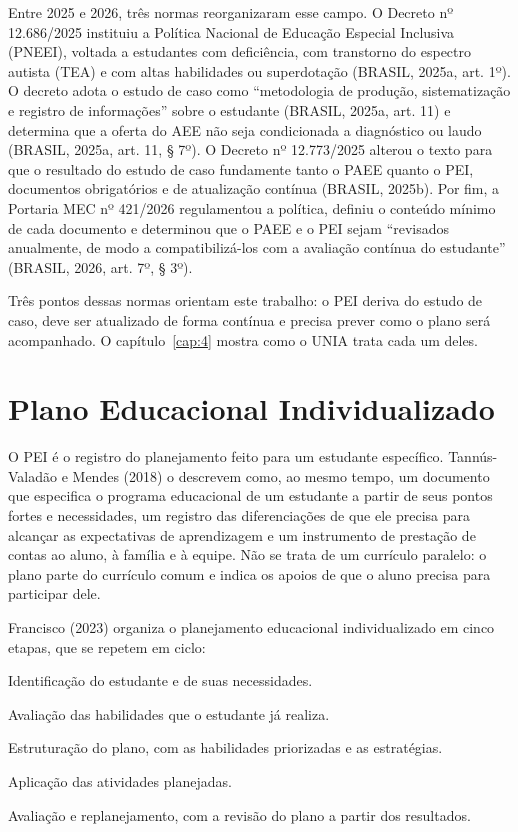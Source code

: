 Entre 2025 e 2026, três normas reorganizaram esse campo. O Decreto nº 12.686/2025 instituiu a Política Nacional de Educação Especial Inclusiva (PNEEI), voltada a estudantes com deficiência, com transtorno do espectro autista (TEA) e com altas habilidades ou superdotação (BRASIL, 2025a, art. 1º). O decreto adota o estudo de caso como “metodologia de produção, sistematização e registro de informações” sobre o estudante (BRASIL, 2025a, art. 11) e determina que a oferta do AEE não seja condicionada a diagnóstico ou laudo (BRASIL, 2025a, art. 11, § 7º). O Decreto nº 12.773/2025 alterou o texto para que o resultado do estudo de caso fundamente tanto o PAEE quanto o PEI, documentos obrigatórios e de atualização contínua (BRASIL, 2025b). Por fim, a Portaria MEC nº 421/2026 regulamentou a política, definiu o conteúdo mínimo de cada documento e determinou que o PAEE e o PEI sejam “revisados anualmente, de modo a compatibilizá-los com a avaliação contínua do estudante” (BRASIL, 2026, art. 7º, § 3º).

Três pontos dessas normas orientam este trabalho: o PEI deriva do estudo de caso, deve ser atualizado de forma contínua e precisa prever como o plano será acompanhado. O capítulo~\ref{cap:4} mostra como o UNIA trata cada um deles.

\section{Plano Educacional Individualizado}\label{sec:2.2}

O PEI é o registro do planejamento feito para um estudante específico. Tannús-Valadão e Mendes (2018) o descrevem como, ao mesmo tempo, um documento que especifica o programa educacional de um estudante a partir de seus pontos fortes e necessidades, um registro das diferenciações de que ele precisa para alcançar as expectativas de aprendizagem e um instrumento de prestação de contas ao aluno, à família e à equipe. Não se trata de um currículo paralelo: o plano parte do currículo comum e indica os apoios de que o aluno precisa para participar dele.

Francisco (2023) organiza o planejamento educacional individualizado em cinco etapas, que se repetem em ciclo:

\begin{passos}
  \item Identificação do estudante e de suas necessidades.
  \item Avaliação das habilidades que o estudante já realiza.
  \item Estruturação do plano, com as habilidades priorizadas e as estratégias.
  \item Aplicação das atividades planejadas.
  \item Avaliação e replanejamento, com a revisão do plano a partir dos resultados.
\end{passos}

